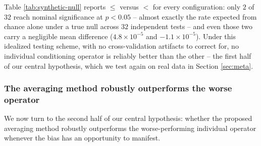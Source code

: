 \documentclass[5p,twocolumn,authoryear]{elsarticle}
\theoremstyle{plain}%
\theoremstyle{remark}%
\theoremstyle{definition}%
\begin{document}
\begin{table}[tbp]
  \caption{Synthetic validation, $\leq$ vs.\ $<$: for each of $32$ (estimator $\times$ configuration) combinations, the absolute mean scores ($s_{\leq}$, $s_{<}$), their difference (\emph{diff}), and the Wilcoxon $p$-value, with $\ast$ marking $p<0.05$. Replicate scores are genuinely independent by construction (fresh i.i.d.\ test data per replicate), so no cross-validation correction is needed or applied.}
  \label{tab:synthetic-null}
  \centering
    \begin{footnotesize}
      
    \end{footnotesize}
\end{table}

Table \ref{tab:synthetic-null} reports $\leq$ versus $<$ for every configuration: only $2$ of $32$ reach nominal significance at $p<0.05$ -- almost exactly the rate expected from chance alone under a true null across $32$ independent tests -- and even those two carry a negligible mean difference ($4.8\times10^{-5}$ and $-1.1\times10^{-5}$). Under this idealized testing scheme, with no cross-validation artifacts to correct for, no individual conditioning operator is reliably better than the other -- the first half of our central hypothesis, which we test again on real data in Section \ref{sec:meta}.

\subsubsection{The averaging method robustly outperforms the worse operator}

We now turn to the second half of our central hypothesis: whether the proposed averaging method robustly outperforms the worse-performing individual operator whenever the bias has an opportunity to manifest.

\begin{table}[tbp]
  \caption{Synthetic validation, averaging vs.\ $\text{worst}(\leq,<)$: same format as Table \ref{tab:synthetic-null}, with absolute mean scores $s_{avg}$ and $s_{worst}$.}
  \label{tab:synthetic}
  \centering
    \begin{footnotesize}
      
    \end{footnotesize}
\end{table}
\end{document}

